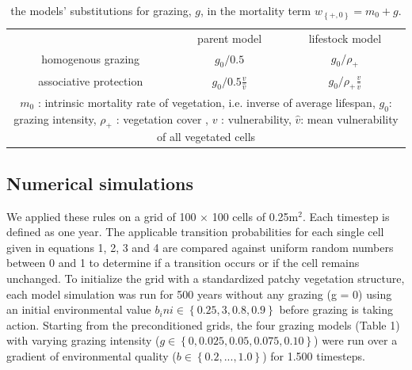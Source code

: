 \begin{table}[!th]
\label{tab:models}
\caption{the models' substitutions for grazing,  $g$, in the mortality term $w_{ \left\{ +,0 \right\} }  = m_0 + g$.  }
\centering
\begin{tabular}{ccc}

\toprule
 & parent model & lifestock model \\ \cmidrule(rl){2-2} \cmidrule(rl){3-3}
homogenous grazing &  $g_0/0.5$ & $g_0/\rho_+$\\
associative protection & $g_0/0.5 \frac{v}{\hat{v}}$  & $g_0/\rho_+ \frac{v}{\hat{v}}$ \\
	\bottomrule
\multicolumn{3}{p{9.5cm}}{\footnotesize $m_0$ : intrinsic mortality rate of vegetation, i.e. inverse of average lifespan, $g_0$: grazing intensity, $\rho_+$ : vegetation cover , $v$ : vulnerability, $\hat{v}$: mean vulnerability of all vegetated cells }
	\end{tabular}
\end{table}



\subsection{Numerical simulations}

We applied these rules on a grid of 100 $\times$ 100 cells of 0.25m$^2$. Each timestep is defined as one year. The applicable transition probabilities for each single cell given in equations 1, 2, 3 and 4 are compared against uniform random numbers between 0 and 1 to determine if a transition occurs or if the cell remains unchanged. To initialize the grid with a standardized patchy vegetation structure, each model simulation was run for 500 years without any grazing (g = 0) using an initial environmental value $ b_ini \in \left\{ 0.25, 3, 0.8, 0.9 \right\} $ before grazing is taking action. %
Starting from the preconditioned grids, the four grazing models (Table 1) with varying grazing intensity ($ g \in \left\{ 0, 0.025, 0.05, 0.075, 0.10 \right\} $) were run over a gradient of environmental quality ($ b \in \left\{ 0.2, ... , 1.0 \right\} $) for 1.500 timesteps. 

